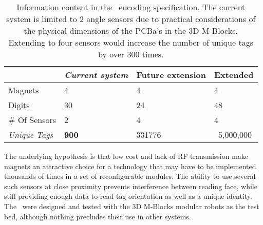 \begin{table}[b]
	\caption{Information content in the \TagNamePlural~encoding specification. The current system is limited to 2 angle sensors due to practical considerations of the physical dimensions of the  PCBa's in the 3D M-Blocks. Extending to four sensors would increase the number of unique tags by over 300 times.}
	
	\begin{tabular}{ p{1.6cm}  p{1.8cm}  p{1.9cm}  p{1.5cm}}
		\hline
								& \textit{Current system} & Future extension & Extended \\
		\hline
				\addlinespace[1ex]
		Magnets  				& 4 			 &	4				&	4	\\
		Digits 					& 30 			 &	24				&	48	\\
		\# Of Sensors 			& 2 			 &	4				&	4	\\
		\textit{Unique Tags} 	& \textbf{900} 	 & 331776			& 	~5,000,000\\
		
	\end{tabular}
	
	\label{tab:hardwareOverview}
\end{table}

The underlying hypothesis is that low cost and lack of RF transmission make magnets an attractive choice for a technology that may have to be implemented thousands of times in a set of reconfigurable modules. The ability to use several such sensors at close proximity prevents interference between reading face, while still providing enough data to read tag orientation as well as a unique identity. The \tagNamePlural~were designed and tested with the 3D M-Blocks modular robots as the test bed, although nothing precludes their use in other systems.

